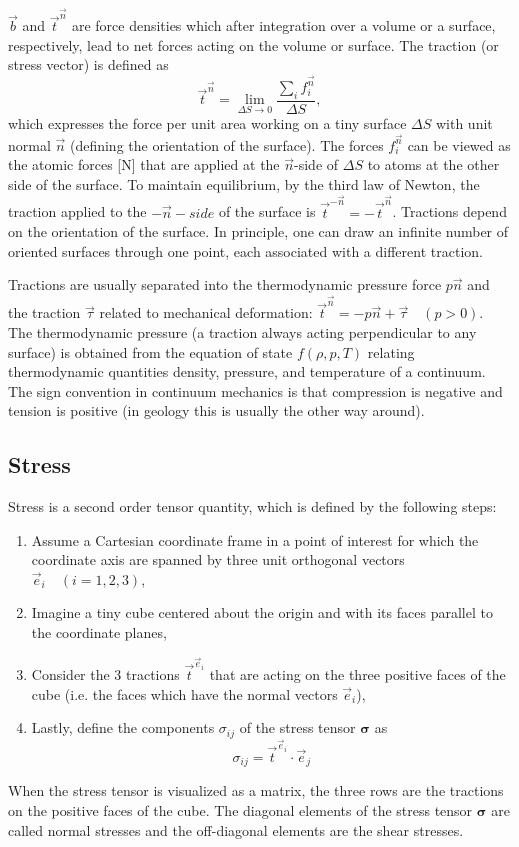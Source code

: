 $\vec{b}$ and $\vec{t}^{\vec n}$
are force densities which after integration over a
volume or a surface, respectively, lead to net forces acting on 
the volume or surface.
The traction (or stress vector) is defined as
\[
\vec{t}^{\vec n} = \lim_{\Delta S \rightarrow 0} 
\frac{\sum\limits_i f_i^{\vec n}}{\Delta S},
\]
which expresses the force
per unit area working on a tiny surface $\Delta S$ 
with unit normal $\vec{n}$ (defining the orientation of
the surface). 
The forces $f_i^{\vec n}$  can be viewed as the atomic 
forces [\si{\newton}] that are applied at the
$\vec{n}$-side of $\Delta S$ to atoms at the other side of the surface. 
To maintain equilibrium, by the
third law of Newton, the traction applied to the $-\vec{n}-side$ of the surface 
is $\vec{t}^{-{\vec n}} = -\vec{t}^{\vec n}$.
Tractions depend on the orientation of the surface. In principle, one can draw an
infinite number of oriented surfaces through one point, each associated with a different
traction.



Tractions are usually separated into the thermodynamic pressure force $p \vec{n}$ and the traction $\vec{\tau}$
related to mechanical deformation: $\vec{t}^{\vec n} = -p \vec{n} + \vec{\tau} \quad (p>0)$. The thermodynamic pressure
(a traction always acting perpendicular to any surface) is obtained from the equation of
state $f(\rho,p,T)$ relating thermodynamic quantities density, pressure, and temperature of a
continuum. The sign convention in continuum mechanics is that compression is negative
and tension is positive (in geology this is usually the other way around).

\subsection{Stress} 

Stress is a second order tensor quantity, which is defined by the following steps:
\begin{enumerate}
\item 
Assume a Cartesian coordinate frame in a point of interest for which the coordinate
axis are spanned by three unit orthogonal vectors $\vec{e}_i \quad (i = 1,2,3)$,
\item Imagine a tiny cube centered about the origin and with its faces parallel to the
coordinate planes,
\item Consider the 3 tractions $\vec{t}^{\vec{e}_i}$ that are acting on the three positive 
faces of the cube (i.e. the faces which have the normal vectors $\vec{e}_i$),
\item Lastly, define the components $\sigma_{ij}$ of the stress tensor ${\bm \sigma}$ as
\begin{equation}
\sigma_{ij} = \vec{t}^{\vec{e}_i} \cdot \vec{e}_j
\label{eq:md01}
\end{equation}
\end{enumerate}
When the stress tensor is visualized as a matrix, the three rows are 
the tractions on the
positive faces of the cube. The diagonal elements of the stress tensor 
${\bm \sigma}$ are called
normal stresses and the off-diagonal elements are the shear stresses.

